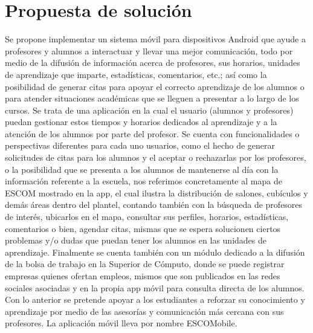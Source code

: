 \section{Propuesta de solución}

\noindent
Se propone implementar un sistema móvil para dispositivos Android que ayude a profesores y alumnos a interactuar y llevar una mejor 
comunicación, todo por medio de la difusión de información acerca de profesores, sus horarios, unidades de aprendizaje que imparte, estadísticas, comentarios, etc.; así como la posibilidad de generar citas para apoyar el correcto aprendizaje de los 
alumnos o para atender situaciones académicas que se lleguen a presentar a lo largo de los cursos.
\newline
\newline
Se trata de una aplicación en la cual el usuario (alumnos y profesores) puedan gestionar estos tiempos y horarios dedicados al aprendizaje y a la atención de los alumnos por parte del profesor. Se cuenta con funcionalidades o perspectivas diferentes para cada uno usuarios, como
el hecho de generar solicitudes de citas para los alumnos y el aceptar o rechazarlas por los profesores, o la posibilidad que se presenta a los alumnos de mantenerse al día con la información referente a la escuela, nos referimos concretamente al mapa de ESCOM mostrado en la app, el cual ilustra la distribución de salones, cubículos y demás áreas dentro del plantel, contando también con la búsqueda de profesores de interés, ubicarlos en el mapa, consultar sus perfiles, horarios, estadísticas, comentarios o bien, agendar citas, mismas que se espera solucionen ciertos problemas y/o dudas que puedan tener los alumnos en las unidades de aprendizaje. Finalmente se cuenta también con un módulo dedicado a la difusión de la bolsa de trabajo en la Superior de Cómputo, donde se puede registrar empresas quienes ofertan empleos, mismos que son publicados en las redes sociales asociadas y en la propia app móvil para consulta directa de los alumnos.
\newline
\newline
Con lo anterior se pretende apoyar a los estudiantes a reforzar su conocimiento y aprendizaje por medio de las asesorías y comunicación más cercana con sus profesores. La aplicación móvil lleva por nombre ESCOMobile.